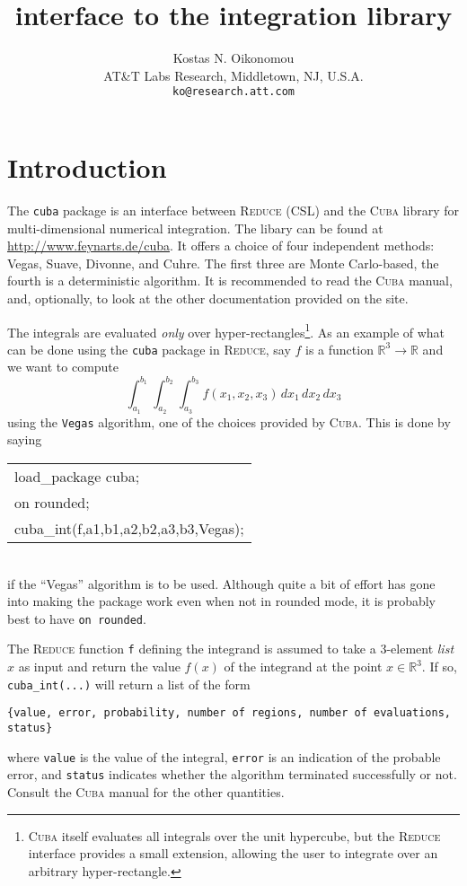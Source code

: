 \documentclass[11pt]{article}
\title{{\Reduce} interface to the {\Cuba} integration library}
\author{Kostas N. Oikonomou\\ AT\&T Labs Research, Middletown, NJ, U.S.A.
  \\ \small\texttt{ko@research.att.com}}
\newcommand{\Reduce}{\textsc{Reduce}}
\newcommand{\Cuba}{\textsc{Cuba}}
\begin{document}
\maketitle

\section{Introduction}

The \texttt{cuba} package is an interface between {\Reduce} (CSL) and the
{\Cuba} library for multi-dimensional numerical integration.  The libary can be
found at \url{http://www.feynarts.de/cuba}.  It offers a choice of four
independent methods: Vegas, Suave, Divonne, and Cuhre. The first three are Monte
Carlo-based, the fourth is a deterministic algorithm.  It is recommended to read
the {\Cuba} manual, and, optionally, to look at the other documentation provided
on the site.

The integrals are evaluated \emph{only} over hyper-rectangles\footnote{{\Cuba}
  itself evaluates all integrals over the unit hypercube, but the {\Reduce}
  interface provides a small extension, allowing the user to integrate over an
  arbitrary hyper-rectangle.}.  As an example of what can be done using the
\texttt{cuba} package in {\Reduce}, say $f$ is a function $\mathbb{R}^3\to
\mathbb{R}$ and we want to compute
\begin{equation*}
  \int_{a_1}^{b_1} \int_{a_2}^{b_2} \int_{a_3}^{b_3} f(x_1,x_2,x_3)\, dx_1 \,
  dx_2 \, dx_3
\end{equation*}
using the \texttt{Vegas} algorithm, one of the choices provided by {\Cuba}.
This is done by saying
\begin{table*}[h]
  \centering
  \ttfamily
  \begin{tabular}{l}
    load\_package cuba; \\
    on rounded; \\
    cuba\_int(f,{{a1,b1},{a2,b2},{a3,b3}},Vegas);
  \end{tabular}
\end{table*}\\
if the ``Vegas'' algorithm is to be used.  Although quite a bit of effort has
gone into making the package work even when not in rounded mode, it is probably
best to have \texttt{on rounded}.

The {\Reduce} function \texttt{f} defining the integrand is assumed to take a
3-element \emph{list} $x$ as input and return the value $f(x)$ of the
integrand at the point $x\in\mathbb{R}^3$.  If so, \texttt{cuba\_int(...)} will
return a list of the form
\begin{center}
  \texttt{\{value, error, probability, number of regions,
            number of evaluations, status\}}
\end{center}
where \texttt{value} is the value of the integral, \texttt{error} is an
indication of the probable error, and \texttt{status} indicates whether the
algorithm terminated successfully or not.  Consult the {\Cuba} manual for the
other quantities.
\end{document}
